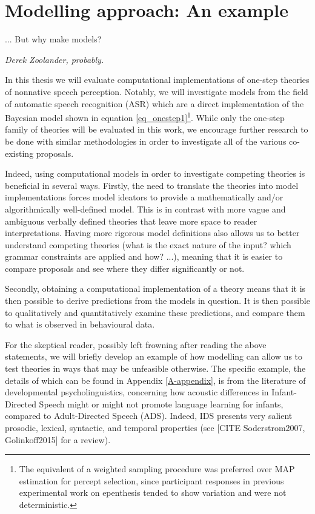 \section{Modelling approach: An example}
\setlength{\epigraphwidth}{0.4\textwidth}
\epigraph{... But why make models?}{\textit{Derek Zoolander, probably.}}

In this thesis we will evaluate computational implementations of one-step theories of nonnative speech perception. Notably, we will investigate models from the field of automatic speech recognition (ASR) which are a direct implementation of the Bayesian model shown in equation \ref{eq_onestep1}\footnote{The equivalent of a weighted sampling procedure was preferred over MAP estimation for percept selection, since participant responses in previous experimental work on epenthesis tended to show variation and were not deterministic.}. 
While only the one-step family of theories will be evaluated in this work, we encourage further research to be done with similar methodologies in order to investigate all of the various co-existing proposals.

Indeed, using computational models in order to investigate competing theories is beneficial in several ways. Firstly, the need to translate the theories into model implementations forces model ideators to provide a mathematically and/or algorithmically well-defined model. This is in contrast with more vague and ambiguous verbally defined theories that leave more space to reader interpretations. Having more rigorous model definitions also allows us to better understand competing theories (what is the exact nature of the input? which grammar constraints are applied and how? ...), meaning that it is easier to compare proposals and see where they differ significantly or not. 

Secondly, obtaining a computational implementation of a theory means that it is then possible to derive predictions from the models in question. It is then possible to qualitatively and quantitatively examine these predictions, and compare them to what is observed in behavioural data.

For the skeptical reader, possibly left frowning after reading the above statements, we will briefly develop an example of how modelling can allow us to test theories in ways that may be unfeasible otherwise. The specific example, the details of which can be found in Appendix \ref{A-appendix}, is from the literature of developmental psycholinguistics, concerning how acoustic differences in Infant-Directed Speech might or might not promote language learning for infants, compared to Adult-Directed Speech (ADS). Indeed, IDS presents very salient prosodic, lexical, syntactic, and temporal properties (see [CITE Soderstrom2007, Golinkoff2015] for a review).

